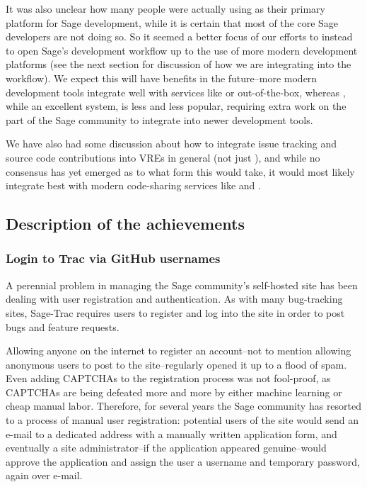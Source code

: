 It was also unclear how many people were actually using \cocalc as their
primary platform for Sage development, while it is certain that most of the
core Sage developers are not doing so.  So it seemed a better focus of our
efforts to instead to open Sage's development workflow up to the use of more
modern development platforms (see the next section for discussion of how we are
integrating \GitLab into the workflow).  We expect this will have benefits in
the future--more modern development tools integrate well with services like
\GitHub or \GitLab out-of-the-box, whereas \Trac, while an excellent system, is
less and less popular, requiring extra work on the part of the Sage community
to integrate into newer development tools.

We have also had some discussion about how to integrate issue tracking and
source code contributions into VREs in general (not just \cocalc), and while no
consensus has yet emerged as to what form this would take, it would most likely
integrate best with modern code-sharing services like \GitHub and \GitLab.


\hypertarget{description-of-the-achievements}{%
\subsection{Description of the
achievements}\label{description-of-the-achievements}}

\hypertarget{trac-github-login}{%
\subsubsection{Login to Trac via GitHub usernames}\label{trac-github-login}}
A perennial problem in managing the Sage community's self-hosted \Trac site has
been dealing with user registration and authentication.  As with many
bug-tracking sites, Sage-Trac requires users to register and log into the site
in order to post bugs and feature requests.

Allowing anyone on the internet to register an account--not to mention allowing
anonymous users to post to the site--regularly opened it up to a flood of spam.
Even adding CAPTCHAs to the registration process was not fool-proof, as
CAPTCHAs are being defeated more and more by either machine learning or cheap
manual labor.  Therefore, for several years the Sage community has resorted
to a process of manual user registration: potential users of the site would
send an e-mail to a dedicated address with a manually written application form,
and eventually a site administrator--if the application appeared genuine--would
approve the application and assign the user a username and temporary password,
again over e-mail.

